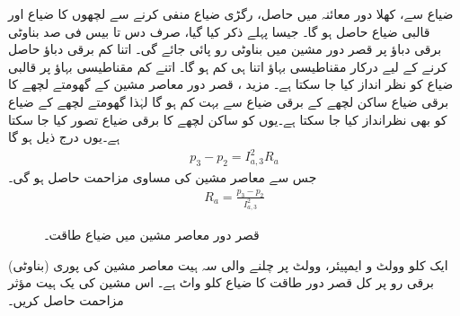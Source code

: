 ضیاع  سے، کھلا دور معائنہ میں حاصل، رگڑی ضیاع  منفی کرنے سے لچھوں کا ضیاع اور قالبی ضیاع حاصل ہو گا۔ جیسا پہلے ذکر کیا گیا، صرف دس تا بیس فی صد بناوٹی برقی دباؤ پر قصر دور مشین میں بناوٹی رو پائی  جائے گی۔ اتنا کم برقی دباؤ حاصل کرنے کے لیے درکار مقناطیسی بہاؤ اتنا ہی کم ہو گا۔ اتنے کم مقناطیسی بہاؤ پر قالبی ضیاع کو نظر انداز کیا جا سکتا ہے۔ مزید ، قصر دور معاصر مشین کے گھومتے لچھے کا برقی ضیاع ساکن لچھے کے برقی ضیاع سے بہت کم ہو گا لہٰذا  گھومتے لچھے کے ضیاع کو بھی نظرانداز کیا جا سکتا ہے۔یوں  کو ساکن لچھے کا برقی ضیاع تصور کیا جا سکتا ہے۔یوں درج ذیل ہو گا
\begin{align*}
p_3-p_2=I_{a,3}^2 R_a
\end{align*}
جس  سے معاصر مشین کی مساوی مزاحمت حاصل ہو گی۔
\begin{align}
R_a=\frac{p_3-p_2}{I_{a,3}^2}
\end{align}
%
\begin{figure}
\centering
\caption{قصر دور معاصر مشین میں ضیاع طاقت۔}
\label{شکل_معاصر_کسر_دور_ضیاع}
\end{figure}
ایک   کلو وولٹ و ایمپیئر،   وولٹ پر چلنے والی سہ ہیت معاصر مشین کی  پوری (بناوٹی) برقی رو پر  کل قصر دور طاقت کا ضیاع   کلو واٹ ہے۔ اس مشین کی یک ہیت مؤثر مزاحمت حاصل کریں۔

